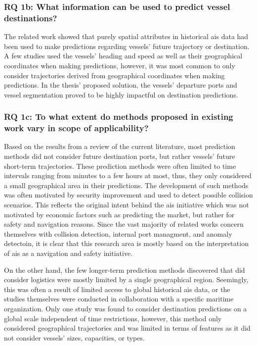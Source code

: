 \subsubsection{RQ 1b: What information can be used to predict vessel destinations?}

The related work showed that purely spatial attributes in historical \acrshort{ais} data had been used to make predictions regarding vessels' future trajectory or destination. A few studies used the vessels' heading and speed as well as their geographical coordinates when making predictions, however, it was most common to only consider trajectories derived from geographical coordinates when making predictions. In the thesis' proposed solution, the vessels' departure ports and vessel segmentation proved to be highly impactful on destination predictions.

\subsubsection{RQ 1c: To what extent do methods proposed in existing work vary in scope of applicability?}

Based on the results from a review of the current literature, most prediction methods did not consider future destination ports, but rather vessels' future short-term trajectories. These prediction methods were often limited to time intervals ranging from minutes to a few hours at most, thus, they only considered a small geographical area in their predictions. The development of such methods was often motivated by security improvement and used to detect possible collision scenarios. This reflects the original intent behind the \acrshort{ais} initiative which was not motivated by economic factors such as predicting the market, but rather for safety and navigation reasons. Since the vast majority of related works concern themselves with collision detection, internal port managment, and anomaly detectoin, it is clear that this research area is mostly based on the interpretation of \acrshort{ais} as a navigation and safety initiative.

On the other hand, the few longer-term prediction methods discovered that did consider logistics were mostly limited by a single geographical region. Seemingly, this was often a result of limited access to global historical \acrshort{ais} data, or the studies themselves were conducted in collaboration with a specific maritime organization. Only one study was found to consider destination predictions on a global scale independent of time restrictions, however, this method only considered geographical trajectories and was limited in terms of features as it did not consider vessels' sizes, capacities, or types.

